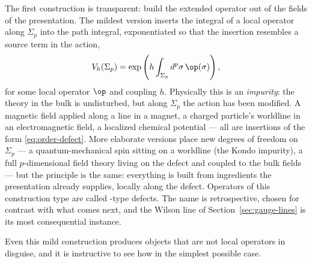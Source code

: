 The first construction is transparent: build the extended operator out of
the fields of the presentation. The mildest version inserts the integral of
a local operator along $\Sigma_p$ into the path integral, exponentiated so
that the insertion resembles a source term in the action,
\begin{equation}
V_h(\Sigma_p) = \exp\left( h \int_{\Sigma_p} d^p\sigma\, \op(\sigma) \right),
\label{eq:order-defect}
\end{equation}
for some local operator $\op$ and coupling $h$. Physically this is an
\emph{impurity}: the theory in the bulk is undisturbed, but along
$\Sigma_p$ the action has been modified. A magnetic field applied along a
line in a magnet, a charged particle's worldline in an electromagnetic
field, a localized chemical potential --- all are insertions of the form
\eqref{eq:order-defect}. More elaborate versions place new degrees of
freedom on $\Sigma_p$ --- a quantum-mechanical spin sitting on a worldline
(the Kondo impurity), a full $p$-dimensional field theory living on the
defect and coupled to the bulk fields --- but the principle is the same:
everything is built from ingredients the presentation already supplies,
locally along the defect. Operators of this construction type are called
-type defects. The name is retrospective, chosen for contrast
with what comes next, and the Wilson line of
Section~\ref{sec:gauge-lines} is its most consequential instance.

Even this mild construction produces objects that are not local operators
in disguise, and it is instructive to see how in the simplest possible
case.

